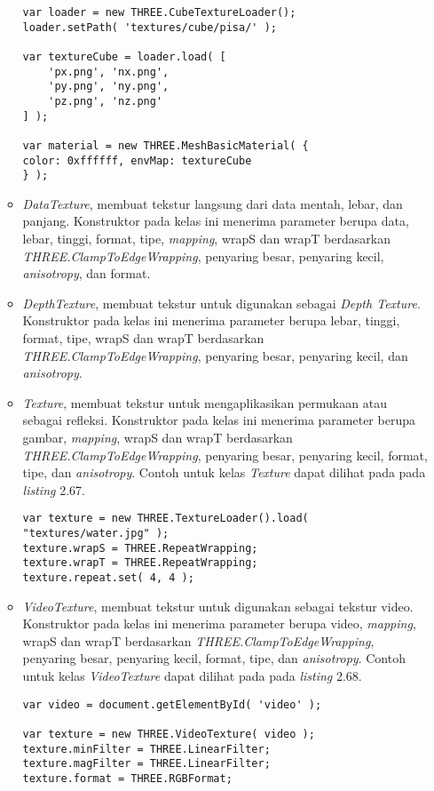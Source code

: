 \begin{itemize}
\begin{itemize}
\begin{lstlisting}[caption={Contoh penggunaan kelas {\it CubeTexture}.},captionpos=b]
var loader = new THREE.CubeTextureLoader();
loader.setPath( 'textures/cube/pisa/' );

var textureCube = loader.load( [
	'px.png', 'nx.png',
	'py.png', 'ny.png',
	'pz.png', 'nz.png'
] );

var material = new THREE.MeshBasicMaterial( { 
color: 0xffffff, envMap: textureCube 
} );
\end{lstlisting}
	
	\item{\it DataTexture}, membuat tekstur langsung dari data mentah, lebar, dan panjang. Konstruktor pada kelas ini menerima parameter berupa data, lebar, tinggi, format, tipe, {\it mapping}, wrapS dan wrapT berdasarkan {\it THREE.ClampToEdgeWrapping}, penyaring besar, penyaring kecil, {\it anisotropy}, dan format.
	\item{\it DepthTexture}, membuat tekstur untuk digunakan sebagai {\it Depth Texture}. Konstruktor pada kelas ini menerima parameter berupa lebar, tinggi, format, tipe, wrapS dan wrapT berdasarkan {\it THREE.ClampToEdgeWrapping}, penyaring besar, penyaring kecil, dan {\it anisotropy}.
	\item {\it Texture}, membuat tekstur untuk mengaplikasikan permukaan atau sebagai refleksi. Konstruktor pada kelas ini menerima parameter berupa gambar, {\it mapping},  wrapS dan wrapT berdasarkan {\it THREE.ClampToEdgeWrapping}, penyaring besar, penyaring kecil, format, tipe, dan {\it anisotropy}. Contoh untuk kelas {\it Texture} dapat dilihat pada pada {\it listing} 2.67.
	
\begin{lstlisting}[caption={Contoh penggunaan kelas {\it Texture}.},captionpos=b]
var texture = new THREE.TextureLoader().load( "textures/water.jpg" );
texture.wrapS = THREE.RepeatWrapping;
texture.wrapT = THREE.RepeatWrapping;
texture.repeat.set( 4, 4 );
\end{lstlisting}
	
	\item{\it VideoTexture}, membuat tekstur untuk digunakan sebagai tekstur video. Konstruktor pada kelas ini menerima parameter berupa video, {\it mapping},  wrapS dan wrapT berdasarkan {\it THREE.ClampToEdgeWrapping}, penyaring besar, penyaring kecil, format, tipe, dan {\it anisotropy}. Contoh untuk kelas {\it VideoTexture} dapat dilihat pada pada {\it listing} 2.68.
	
\begin{lstlisting}[caption={Contoh penggunaan kelas {\it VideoTexture}.},captionpos=b]
var video = document.getElementById( 'video' );

var texture = new THREE.VideoTexture( video );
texture.minFilter = THREE.LinearFilter;
texture.magFilter = THREE.LinearFilter;
texture.format = THREE.RGBFormat;
\end{lstlisting}
	
	\end{itemize}	
	
\end{itemize}
 

